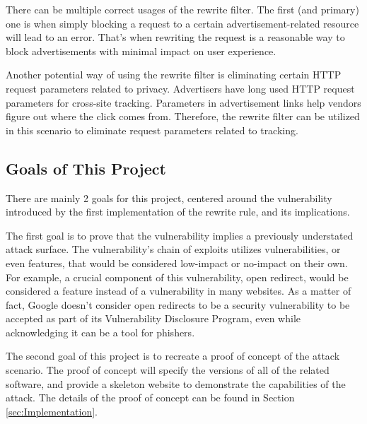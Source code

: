 \documentclass[conference]{IEEEtran}
\begin{document}
There can be multiple correct usages of the rewrite filter. The first (and primary) one is when simply blocking a request to a certain advertisement-related resource will lead to an error. That's when rewriting the request is a reasonable way to block advertisements with minimal impact on user experience.

Another potential way of using the rewrite filter is eliminating certain HTTP request parameters related to privacy. Advertisers have long used HTTP request parameters for cross-site tracking. Parameters in advertisement links help vendors figure out where the click comes from. Therefore, the rewrite filter can be utilized in this scenario to eliminate request parameters related to tracking.

\subsection{Goals of This Project}
There are mainly 2 goals for this project, centered around the vulnerability introduced by the first implementation of the rewrite rule, and its implications.

The first goal is to prove that the vulnerability implies a previously understated attack surface. The vulnerability's chain of exploits utilizes vulnerabilities, or even features, that would be considered low-impact or no-impact on their own. For example, a crucial component of this vulnerability, open redirect, would be considered a feature instead of a vulnerability in many websites. As a matter of fact, Google doesn't consider open redirects to be a security vulnerability to be accepted as part of its Vulnerability Disclosure Program, even while acknowledging it can be a tool for phishers.\cite{noauthor_open_nodate}

The second goal of this project is to recreate a proof of concept of the attack scenario. The proof of concept will specify the versions of all of the related software, and provide a skeleton website to demonstrate the capabilities of the attack. The details of the proof of concept can be found in Section \ref{sec:Implementation}.
\end{document}
